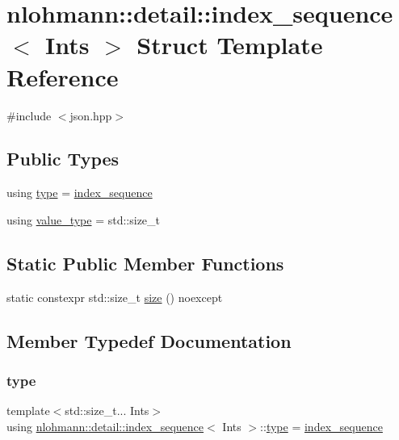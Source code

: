 \hypertarget{structnlohmann_1_1detail_1_1index__sequence}{}\section{nlohmann\+::detail\+::index\+\_\+sequence$<$ Ints $>$ Struct Template Reference}
\label{structnlohmann_1_1detail_1_1index__sequence}


{\ttfamily \#include $<$json.\+hpp$>$}

\subsection*{Public Types}
\begin{DoxyCompactItemize}
\item 
using \mbox{\hyperlink{structnlohmann_1_1detail_1_1index__sequence_a3c14c4ab277de72b166806193ff4fa10}{type}} = \mbox{\hyperlink{structnlohmann_1_1detail_1_1index__sequence}{index\+\_\+sequence}}
\item 
using \mbox{\hyperlink{structnlohmann_1_1detail_1_1index__sequence_a2eca43d08fc1eb68bd5fa75b6714d21d}{value\+\_\+type}} = std\+::size\+\_\+t
\end{DoxyCompactItemize}
\subsection*{Static Public Member Functions}
\begin{DoxyCompactItemize}
\item 
static constexpr std\+::size\+\_\+t \mbox{\hyperlink{structnlohmann_1_1detail_1_1index__sequence_a7ac529419787d775f52408135304b337}{size}} () noexcept
\end{DoxyCompactItemize}


\subsection{Member Typedef Documentation}
\mbox{\label{structnlohmann_1_1detail_1_1index__sequence_a3c14c4ab277de72b166806193ff4fa10}} 
\subsubsection{\texorpdfstring{type}{type}}
{\footnotesize\ttfamily template$<$std\+::size\+\_\+t... Ints$>$ \\
using \mbox{\hyperlink{structnlohmann_1_1detail_1_1index__sequence}{nlohmann\+::detail\+::index\+\_\+sequence}}$<$ Ints $>$\+::\mbox{\hyperlink{structnlohmann_1_1detail_1_1index__sequence_a3c14c4ab277de72b166806193ff4fa10}{type}} =  \mbox{\hyperlink{structnlohmann_1_1detail_1_1index__sequence}{index\+\_\+sequence}}}

